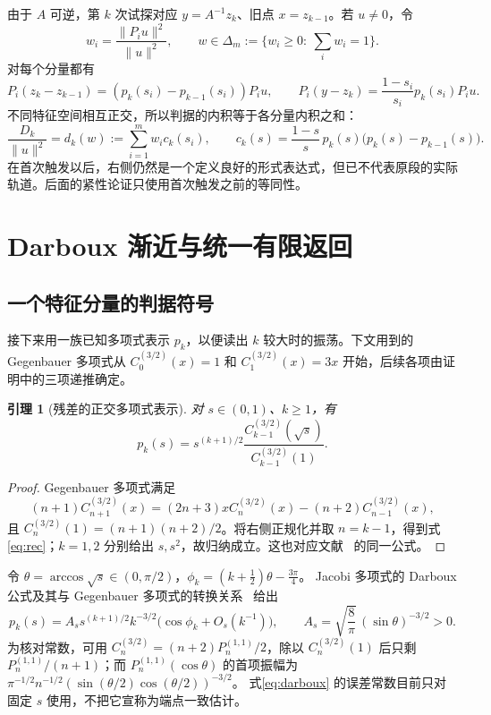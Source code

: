 \documentclass[11pt,a4paper,UTF8,fontset=fandol]{ctexart}
\newtheorem{lemma}[theorem]{引理}
\theoremstyle{remark}\newtheorem{remark}[theorem]{说明}
\newcommand{\norm}[1]{\lVert #1\rVert}
\begin{document}
由于 $A$ 可逆，第 $k$ 次试探对应 $y=A^{-1}z_k$、旧点 $x=z_{k-1}$。若 $u\ne0$，令
\[
 w_i=\frac{\norm{P_i u}^2}{\norm{u}^2},\qquad
 w\in\Delta_m:=\{w_i\ge0:\ \sum_iw_i=1\}.
\]
对每个分量都有
\[
 P_i(z_k-z_{k-1})=(p_k(s_i)-p_{k-1}(s_i))P_i u,\qquad
 P_i(y-z_k)=\frac{1-s_i}{s_i}p_k(s_i)P_i u .
\]
不同特征空间相互正交，所以判据的内积等于各分量内积之和：
\begin{equation}\label{eq:criterion}
 \frac{D_k}{\norm{u}^2}=d_k(w):=\sum_{i=1}^m w_i c_k(s_i),
 \qquad
 c_k(s)=\frac{1-s}{s}\,p_k(s)\bigl(p_k(s)-p_{k-1}(s)\bigr).
\end{equation}
在首次触发以后，右侧仍然是一个定义良好的形式表达式，但已不代表原段的实际轨道。后面的紧性论证只使用首次触发之前的等同性。

\section{Darboux 渐近与统一有限返回}
\subsection{一个特征分量的判据符号}
接下来用一族已知多项式表示 \(p_k\)，以便读出 \(k\) 较大时的振荡。下文用到的 Gegenbauer 多项式从 \(C_0^{(3/2)}(x)=1\) 和 \(C_1^{(3/2)}(x)=3x\) 开始，后续各项由证明中的三项递推确定。
\begin{lemma}[残差的正交多项式表示]\label{lem:gegenbauer}
对 $s\in(0,1)$、$k\ge1$，有
\begin{equation}\label{eq:gegenbauer}
 p_k(s)=s^{(k+1)/2}
 \frac{C_{k-1}^{(3/2)}(\sqrt{s})}{C_{k-1}^{(3/2)}(1)}.
\end{equation}
\end{lemma}
\begin{proof}
Gegenbauer 多项式满足
\[
 (n+1)C_{n+1}^{(3/2)}(x)
 =(2n+3)xC_n^{(3/2)}(x)-(n+2)C_{n-1}^{(3/2)}(x),
\]
且 $C_n^{(3/2)}(1)=(n+1)(n+2)/2$。将右侧正规化并取 $n=k-1$，得到式\eqref{eq:rec}；$k=1,2$ 分别给出 $s,s^2$，故归纳成立。这也对应文献~\cite{kindermann} 的同一公式。
\end{proof}

令 $\theta=\arccos\sqrt{s}\in(0,\pi/2)$，$\phi_k=(k+\tfrac12)\theta-\tfrac{3\pi}{4}$。
Jacobi 多项式的 Darboux 公式及其与 Gegenbauer 多项式的转换关系~\cite{dlmf} 给出
\begin{equation}\label{eq:darboux}
 p_k(s)=A_s s^{(k+1)/2}k^{-3/2}
 \bigl(\cos\phi_k+O_s(k^{-1})\bigr),\qquad
 A_s=\sqrt{\frac8\pi}\,(\sin\theta)^{-3/2}>0.
\end{equation}
为核对常数，可用
$C_n^{(3/2)}=(n+2)P_n^{(1,1)}/2$，除以
$C_n^{(3/2)}(1)$ 后只剩 $P_n^{(1,1)}/(n+1)$；而
$P_n^{(1,1)}(\cos\theta)$ 的首项振幅为
$\pi^{-1/2}n^{-1/2}(\sin(\theta/2)\cos(\theta/2))^{-3/2}$。
式\eqref{eq:darboux} 的误差常数目前只对固定 $s$ 使用，不把它宣称为端点一致估计。
\end{document}
